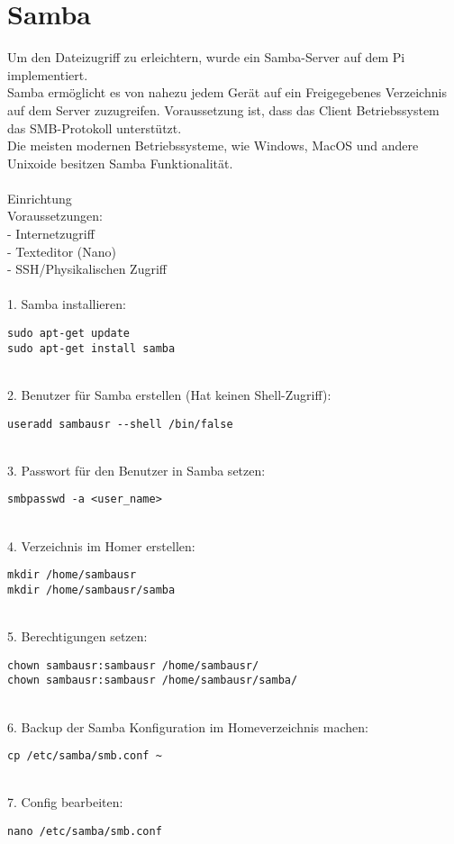 \section{Samba}
Um den Dateizugriff zu erleichtern, wurde ein Samba-Server auf dem Pi implementiert.\\
Samba ermöglicht es von nahezu jedem Gerät auf ein Freigegebenes Verzeichnis auf dem Server zuzugreifen. Voraussetzung ist, dass das Client Betriebssystem das SMB-Protokoll unterstützt.\\
Die meisten modernen Betriebssysteme, wie Windows, MacOS und andere Unixoide besitzen Samba Funktionalität.\\
~\\
Einrichtung\\
Voraussetzungen:\\
- Internetzugriff\\
- Texteditor (Nano)\\
- SSH/Physikalischen Zugriff\\
\\
1. Samba installieren:
\begin{lstlisting}
sudo apt-get update
sudo apt-get install samba
\end{lstlisting}
~\\
2. Benutzer für Samba erstellen (Hat keinen Shell-Zugriff):
\begin{lstlisting}
useradd sambausr --shell /bin/false
\end{lstlisting}
~\\
3. Passwort für den Benutzer in Samba setzen:
\begin{lstlisting}
smbpasswd -a <user_name>
\end{lstlisting}
~\\
4. Verzeichnis im Homer erstellen:
\begin{lstlisting}
mkdir /home/sambausr
mkdir /home/sambausr/samba
\end{lstlisting}
~\\
5. Berechtigungen setzen:
\begin{lstlisting}
chown sambausr:sambausr /home/sambausr/
chown sambausr:sambausr /home/sambausr/samba/
\end{lstlisting}
~\\
6. Backup der Samba Konfiguration im Homeverzeichnis machen:
\begin{lstlisting}
cp /etc/samba/smb.conf ~
\end{lstlisting}
~\\
7. Config bearbeiten:
\begin{lstlisting}
nano /etc/samba/smb.conf
\end{lstlisting}
